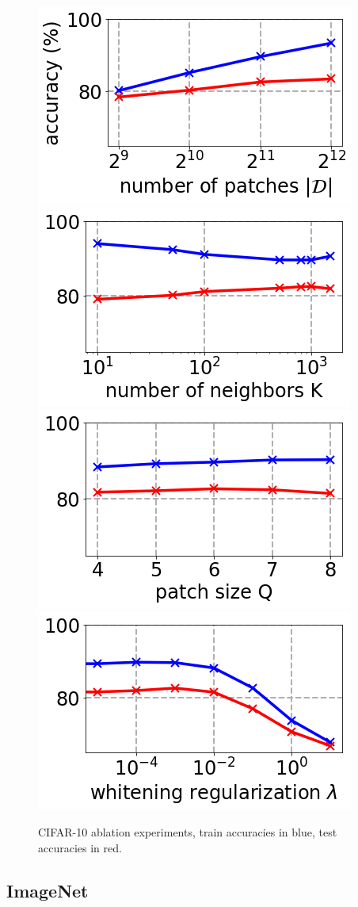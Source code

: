 \documentclass{article} %
\begin{document}
\begin{figure}
\vspace{-10pt}
\caption{ CIFAR-10 ablation experiments, train accuracies in blue, test accuracies in red.}  
    \centering
    \includegraphics[width=0.245\linewidth]{figures/ablation_npatches.png}
    \includegraphics[width=0.245\linewidth]{figures/ablation_K.png}
    \includegraphics[width=0.245\linewidth]{figures/ablation_Q.png}
    \includegraphics[width=0.245\linewidth]{figures/ablation_lambda.png}\\
      \label{fig:ablation_study}
    \vspace{-10pt}
\end{figure}

\subsection{ImageNet}
\end{document}
